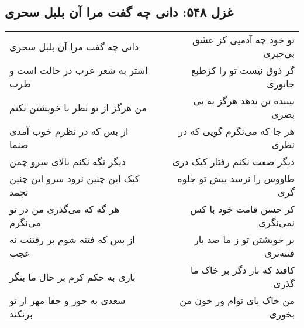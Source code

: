 \begin{center}
\section*{غزل ۵۴۸: دانی چه گفت مرا آن بلبل سحری}
\label{sec:548}
\begin{longtable}{l p{0.5cm} r}
دانی چه گفت مرا آن بلبل سحری
&&
تو خود چه آدمیی کز عشق بی‌خبری
\\
اشتر به شعر عرب در حالت است و طرب
&&
گر ذوق نیست تو را کژطبع جانوری
\\
من هرگز از تو نظر با خویشتن نکنم
&&
بیننده تن ندهد هرگز به بی بصری
\\
از بس که در نظرم خوب آمدی صنما
&&
هر جا که می‌نگرم گویی که در نظری
\\
دیگر نگه نکنم بالای سرو چمن
&&
دیگر صفت نکنم رفتار کبک دری
\\
کبک این چنین نرود سرو این چنین نچمد
&&
طاووس را نرسد پیش تو جلوه گری
\\
هر گه که می‌گذری من در تو می‌نگرم
&&
کز حسن قامت خود با کس نمی‌نگری
\\
از بس که فتنه شوم بر رفتنت نه عجب
&&
بر خویشتن تو ز ما صد بار فتنه‌تری
\\
باری به حکم کرم بر حال ما بنگر
&&
کافتد که بار دگر بر خاک ما گذری
\\
سعدی به جور و جفا مهر از تو برنکند
&&
من خاک پای توام ور خون من بخوری
\\
\end{longtable}
\end{center}
